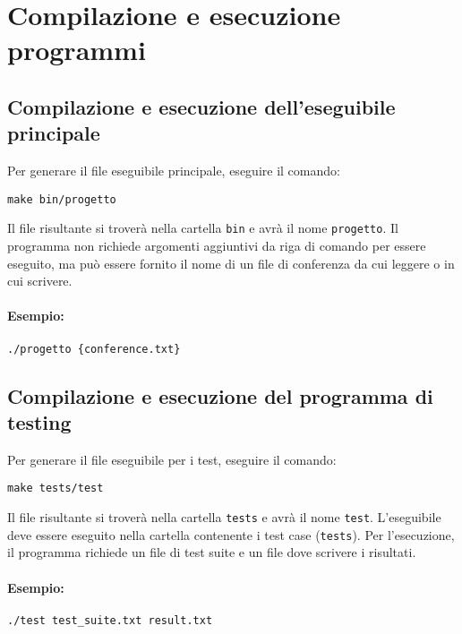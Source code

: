 \documentclass[11pt]{scrartcl} %
\begin{document}
\begin{minipage}{\linewidth}
\section{Compilazione e esecuzione programmi}

\subsection{Compilazione e esecuzione dell'eseguibile principale}
Per generare il file eseguibile principale, eseguire il comando:
\begin{verbatim}
make bin/progetto
\end{verbatim}
Il file risultante si troverà nella cartella \texttt{bin} e avrà il nome \texttt{progetto}. Il programma non richiede argomenti aggiuntivi da riga di comando per essere eseguito, ma può essere fornito il nome di un file di conferenza da cui leggere o in cui scrivere.

\paragraph{Esempio:}
\begin{verbatim}
./progetto {conference.txt}
\end{verbatim}


\subsection{Compilazione e esecuzione del programma di testing}
Per generare il file eseguibile per i test, eseguire il comando:
\begin{verbatim}
make tests/test
\end{verbatim}
Il file risultante si troverà nella cartella \texttt{tests} e avrà il nome \texttt{test}. L'eseguibile deve essere eseguito nella cartella contenente i test case (\texttt{tests}). Per l'esecuzione, il programma richiede un file di test suite e un file dove scrivere i risultati.

\paragraph{Esempio:}
\begin{verbatim}
./test test_suite.txt result.txt
\end{verbatim}

\end{minipage}

\end{document}
